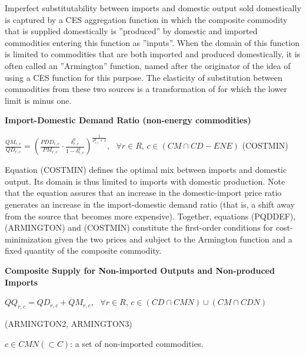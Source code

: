 \documentclass[10pt,a4paper,titlepage,dvipdfmx]{book}
\begin{document}
Imperfect substitutability between imports and domestic output sold domestically is captured by a CES aggregation function in which the composite commodity that is supplied domestically is ''produced'' by domestic and imported commodities entering this function as ''inputs''. When the domain of this function is limited to commodities that are both imported and produced domestically, it is often called an ''Armington'' function, named after the originator of the idea of using a CES function for this purpose. The elasticity of substitution between commodities from these two sources is a transformation of for which the lower limit is minus one.

\begin{flushleft}\textbf{Import-Domestic Demand Ratio (non-energy commodities)}\end{flushleft}


\begin{center}$\frac{QM_{r,c}}{QD_{r,c}}=\left(\frac{PDD_{r,c}}{PM_{r,c}}\cdot \frac{\delta _{r,c}^{q}}{1-\delta _{r,c}^{q}}\right)^{\frac{1}{\rho _{r,c}^{q}+1}},\,\,\,\,\forall r\in R,\,c\in \left(CM\cap CD-ENE\right)$ (COSTMIN)
\end{center}

Equation (COSTMIN) defines the optimal mix between imports and domestic output. Its domain is thus limited to imports with domestic production. Note that the equation assures that an increase in the domestic-import price ratio generates an increase in the import-domestic demand ratio (that is, a shift away from the source that becomes more expensive). Together, equations (PQDDEF), (ARMINGTON) and (COSTMIN) constitute the first-order conditions for cost-minimization given the two prices and subject to the Armington function and a fixed quantity of the composite commodity.

\begin{flushleft}\textbf{Composite Supply for Non-imported Outputs and Non-produced Imports}\end{flushleft}


\begin{center}$QQ_{r,c}=QD_{r,c}+QM_{r,c},\,\,\,\,\forall r\in R,\,c\in \left(CD\cap CMN\right)\cup \left(CM\cap CDN\right)$ 
\end{center}


\begin{flushright}(ARMINGTON2, ARMINGTON3)
\end{flushright}

\begin{flushleft} $c\in CMN\left(\subset C\right)$: a set of non-imported commodities. \end{flushleft}
\end{document}
